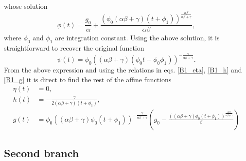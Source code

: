 \documentclass{article}
\begin{document}
whose solution
\begin{equation}
    \phi(t) = \frac{g_0}{\alpha} + \frac{\left(\phi_0 \left(\alpha\beta + \gamma\right) \left(t +  \phi_1\right)\right)^{\frac{\alpha\beta}{\alpha\beta + \gamma}}}{\alpha\beta},
\end{equation}
where $\phi_0$ and $\phi_1$ are integration constant. Using the above solution, it is straightforward to recover the original function
\begin{equation}
    \psi(t) = \phi_0 \left(\left(\alpha\beta + \gamma\right)\left(\phi_0 t + \phi_0\phi_1\right)\right)^{-\frac{\gamma}{\alpha\beta + \gamma}}.
\end{equation}
From the above expression and using the relations in eqs. \eqref{B1_eta}, \eqref{B1_h} and \eqref{B1_g} it is direct to find the rest of the
affine functions
\begin{align}
    \eta(t) & = 0,\\
    h(t) & = - \frac{\gamma}{2\left(\alpha\beta + \gamma\right)\left(t + \phi_1\right)},\\
    g(t) & = \phi_0 \left(\left(\alpha\beta + \gamma\right)\phi_0 \left(t + \phi_1\right)\right)^{-\frac{\gamma}{\alpha\beta + \gamma}}
    \left(g_0 - \frac{\left(\left(\alpha\beta + \gamma\right)\phi_0\left(t + \phi_1\right)\right)^{\frac{\alpha\beta}{\alpha\beta + \gamma}}}{\beta}\right)
\end{align}


\subsection{Second branch}
\end{document}
